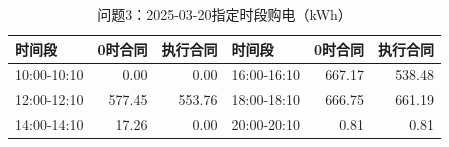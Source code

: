 \begin{table}[H]\centering\small\caption{问题3：2025-03-20指定时段购电（kWh）}\label{tab:q320250320p}
\begin{tabular}{lrrlrr}\toprule
时间段 & 0时合同 & 执行合同 & 时间段 & 0时合同 & 执行合同\\\midrule
10:00-10:10 & 0.00 & 0.00 & 16:00-16:10 & 667.17 & 538.48\\
12:00-12:10 & 577.45 & 553.76 & 18:00-18:10 & 666.75 & 661.19\\
14:00-14:10 & 17.26 & 0.00 & 20:00-20:10 & 0.81 & 0.81\\
\bottomrule\end{tabular}\end{table}
